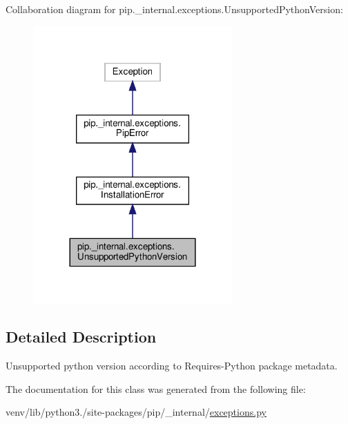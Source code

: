 Collaboration diagram for pip.\+\_\+internal.\+exceptions.\+Unsupported\+Python\+Version\+:
\nopagebreak
\begin{figure}[H]
\begin{center}
\leavevmode
\includegraphics[width=216pt]{classpip_1_1__internal_1_1exceptions_1_1UnsupportedPythonVersion__coll__graph}
\end{center}
\end{figure}


\subsection{Detailed Description}
\begin{DoxyVerb}Unsupported python version according to Requires-Python package
metadata.\end{DoxyVerb}
 

The documentation for this class was generated from the following file\+:\begin{DoxyCompactItemize}
\item 
venv/lib/python3./site-\/packages/pip/\+\_\+internal/\hyperlink{pip_2__internal_2exceptions_8py}{exceptions.\+py}\end{DoxyCompactItemize}
